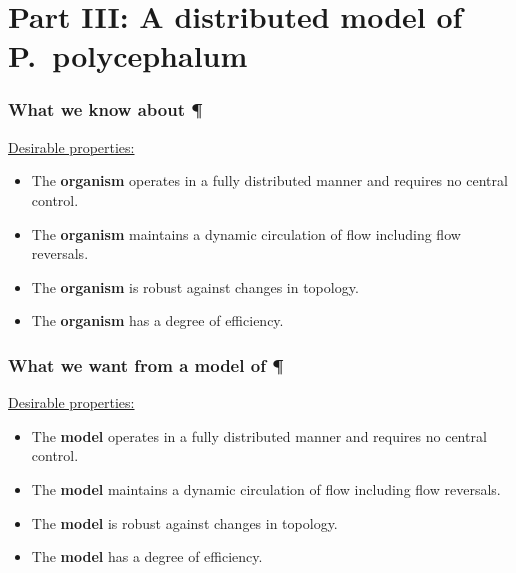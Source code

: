 \documentclass[	hyperref={pdfpagelabels=false}, xcolor=dvipsnames,
		11pt]{beamer}
\begin{document}
\section{Part III: A distributed model of P.~polycephalum} 

\begin{frame}
    \frametitle{What we know about \P} 

	\begin{alertblock}{\underline{Desirable properties:}}
	 \begin{itemize}
	 	\item The \textbf{organism} operates in a fully distributed manner and requires no central control.
		\item The \textbf{organism} maintains a dynamic circulation of flow including flow reversals.
		\item The \textbf{organism} is robust against changes in topology.
		\item The \textbf{organism} has a degree of efficiency.
	 \end{itemize}
	\end{alertblock}
\end{frame}
\begin{frame}[noframenumbering]
    \frametitle{What we want from a model of \P} 

	\begin{alertblock}{\underline{Desirable properties:}}
	 \begin{itemize}
	 	\item The \textbf{model} operates in a fully distributed manner and requires no central control.
		\item The \textbf{model} maintains a dynamic circulation of flow including flow reversals.
		\item The \textbf{model} is robust against changes in topology.
		\item The \textbf{model} has a degree of efficiency.
	 \end{itemize}
	\end{alertblock}
\end{frame}
\end{document}
